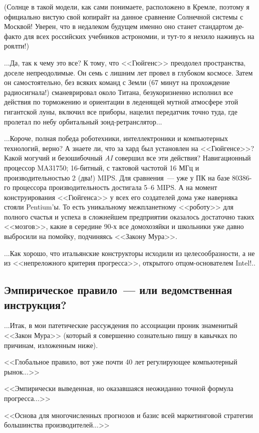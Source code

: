 \documentclass{scrbook}
\newcommand{\flqq}{<<}
\newcommand{\frqq}{>>}
\newcommand{\mdash}{~--- }
\newcommand{\ndash}{--}
\newcommand{\essaysection}[1]{\subsection*{#1}\nopagebreak}
\begin{document}
(Солнце в такой модели, как сами понимаете, расположено в Кремле, поэтому я официально вистую свой копирайт на данное сравнение Солнечной системы с Москвой! Уверен, что в недалеком будущем именно оно станет стандартом де-факто для всех российских учебников астрономии, и тут-то я нехило наживусь на роялти!)

...Да, так к чему это все? К тому, что {\flqq}Гюйгенс{\frqq} преодолел пространства, доселе непреодолимые. Он семь с лишним лет провел в глубоком космосе. Затем он самостоятельно, без всяких команд с Земли (67 минут на прохождение радиосигнала!) сманеврировал около Титана, безукоризненно исполнил все действия по торможению и ориентации в леденящей мутной атмосфере этой гигантской луны, включил все приборы, нацелил передатчик точно туда, где пролетал по небу орбитальный зонд-ретранслятор...

...Короче, полная победа роботехники, интеллектроники и компьютерных технологий, верно? А знаете ли, что за хард был установлен на {\flqq}Гюйгенсе{\frqq}? Какой могучий и безошибочный \emph{AI} совершил все эти действия? Навигационный процессор MA31750; 16-битный, с тактовой частотой 16 МГц и производительностью 2 (два!) MIPS. Для сравнения{\mdash}уже у ПК на базе 80386-го процессора производительность достигала 5{\ndash}6 MIPS. А на момент конструирования {\flqq}Гюйгенса{\frqq} у всех его создателей дома уже наверняка стояли Pentium'ы. То есть уникальному межпланетному {\flqq}роботу{\frqq} для полного счастья и успеха в сложнейшем предприятии оказалось достаточно таких {\flqq}мозгов{\frqq}, какие в середине 90-х все домохозяйки и школьники уже давно выбросили на помойку, подчиняясь {\flqq}Закону Мура{\frqq}.

...Как хорошо, что итальянские конструкторы исходили из целесообразности, а не из {\flqq}непреложного критерия прогресса{\frqq}, открытого отцом-основателем Intel!..

\essaysection{Эмпирическое правило{\mdash}или ведомственная инструкция?}

...Итак, в мои патетические рассуждения по ассоциации проник знаменитый {\flqq}Закон Мура{\frqq} (который я совершенно сознательно пишу в кавычках по причинам, изложенным ниже).

{\flqq}Глобальное правило, вот уже почти 40 лет регулирующее компьютерный рынок...{\frqq}

{\flqq}Эмпирически выведенная, но оказавшаяся неожиданно точной формула прогресса...{\frqq}

{\flqq}Основа для многочисленных прогнозов и базис всей маркетинговой стратегии большинства производителей...{\frqq}
\end{document}
